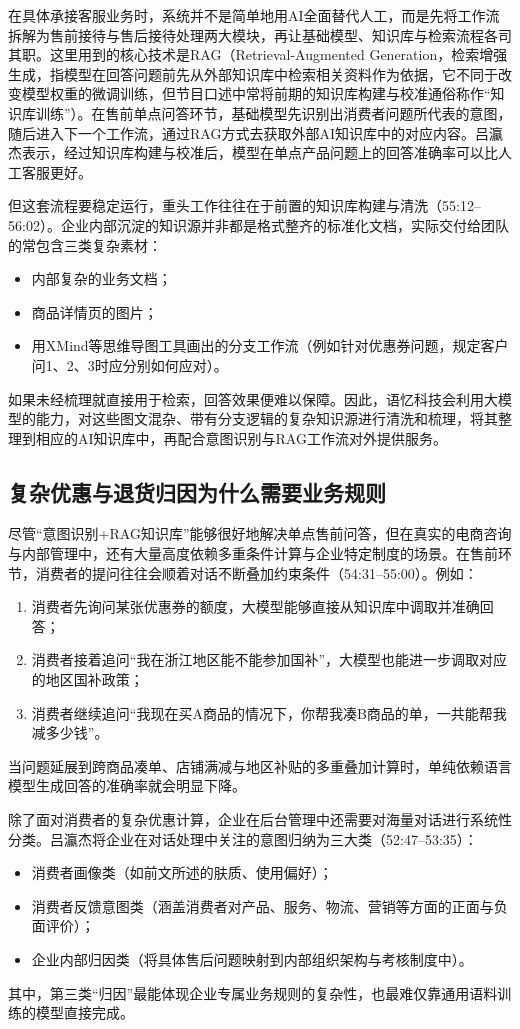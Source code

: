 \documentclass[UTF8,a4paper,11pt,fontset=fandol]{ctexart}
\begin{document}
在具体承接客服业务时，系统并不是简单地用AI全面替代人工，而是先将工作流拆解为售前接待与售后接待处理两大模块，再让基础模型、知识库与检索流程各司其职。这里用到的核心技术是RAG（Retrieval-Augmented Generation，检索增强生成，指模型在回答问题前先从外部知识库中检索相关资料作为依据，它不同于改变模型权重的微调训练，但节目口述中常将前期的知识库构建与校准通俗称作“知识库训练”）。在售前单点问答环节，基础模型先识别出消费者问题所代表的意图，随后进入下一个工作流，通过RAG方式去获取外部AI知识库中的对应内容。吕瀛杰表示，经过知识库构建与校准后，模型在单点产品问题上的回答准确率可以比人工客服更好。

但这套流程要稳定运行，重头工作往往在于前置的知识库构建与清洗（55:12–56:02）。企业内部沉淀的知识源并非都是格式整齐的标准化文档，实际交付给团队的常包含三类复杂素材：
\begin{itemize}
\item 内部复杂的业务文档；
\item 商品详情页的图片；
\item 用XMind等思维导图工具画出的分支工作流（例如针对优惠券问题，规定客户问1、2、3时应分别如何应对）。
\end{itemize}
如果未经梳理就直接用于检索，回答效果便难以保障。因此，语忆科技会利用大模型的能力，对这些图文混杂、带有分支逻辑的复杂知识源进行清洗和梳理，将其整理到相应的AI知识库中，再配合意图识别与RAG工作流对外提供服务。

\subsection{复杂优惠与退货归因为什么需要业务规则}
尽管“意图识别+RAG知识库”能够很好地解决单点售前问答，但在真实的电商咨询与内部管理中，还有大量高度依赖多重条件计算与企业特定制度的场景。在售前环节，消费者的提问往往会顺着对话不断叠加约束条件（54:31–55:00）。例如：
\begin{enumerate}
\item 消费者先询问某张优惠券的额度，大模型能够直接从知识库中调取并准确回答；
\item 消费者接着追问“我在浙江地区能不能参加国补”，大模型也能进一步调取对应的地区国补政策；
\item 消费者继续追问“我现在买A商品的情况下，你帮我凑B商品的单，一共能帮我减多少钱”。
\end{enumerate}
当问题延展到跨商品凑单、店铺满减与地区补贴的多重叠加计算时，单纯依赖语言模型生成回答的准确率就会明显下降。

除了面对消费者的复杂优惠计算，企业在后台管理中还需要对海量对话进行系统性分类。吕瀛杰将企业在对话处理中关注的意图归纳为三大类（52:47–53:35）：
\begin{itemize}
\item 消费者画像类（如前文所述的肤质、使用偏好）；
\item 消费者反馈意图类（涵盖消费者对产品、服务、物流、营销等方面的正面与负面评价）；
\item 企业内部归因类（将具体售后问题映射到内部组织架构与考核制度中）。
\end{itemize}
其中，第三类“归因”最能体现企业专属业务规则的复杂性，也最难仅靠通用语料训练的模型直接完成。
\end{document}
